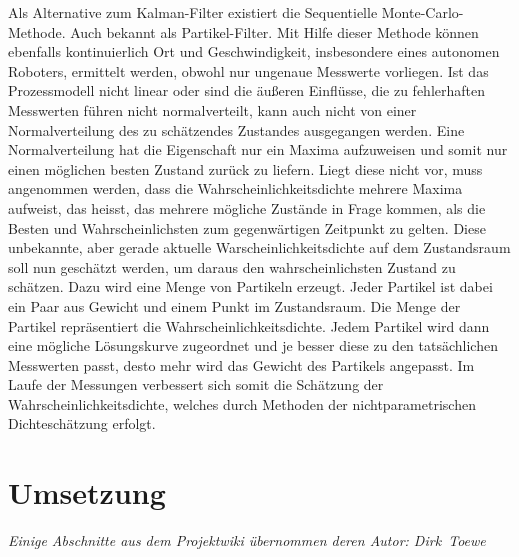 Als Alternative zum Kalman-Filter existiert die Sequentielle Monte-Carlo-Methode. Auch bekannt als Partikel-Filter. Mit Hilfe dieser Methode können ebenfalls kontinuierlich Ort und Geschwindigkeit, insbesondere eines autonomen Roboters, ermittelt werden, obwohl nur ungenaue Messwerte vorliegen.
Ist das Prozessmodell nicht linear oder sind die äußeren Einflüsse, die zu fehlerhaften Messwerten führen nicht normalverteilt, kann auch nicht von einer Normalverteilung des zu schätzendes Zustandes ausgegangen werden. Eine Normalverteilung hat die Eigenschaft nur ein Maxima aufzuweisen und somit nur einen möglichen besten Zustand zurück zu liefern. Liegt diese nicht vor, muss angenommen werden, dass die Wahrscheinlichkeitsdichte mehrere Maxima aufweist, das heisst, das mehrere mögliche Zustände in Frage kommen, als die Besten und Wahrscheinlichsten zum gegenwärtigen Zeitpunkt zu gelten.
Diese unbekannte, aber gerade aktuelle Warscheinlichkeitsdichte auf dem Zustandsraum soll nun geschätzt werden, um daraus den wahrscheinlichsten Zustand zu schätzen. Dazu wird eine Menge von Partikeln erzeugt. Jeder Partikel ist dabei ein Paar aus Gewicht und einem Punkt im Zustandsraum. Die Menge der Partikel repräsentiert die Wahrscheinlichkeitsdichte.
Jedem Partikel wird dann eine mögliche Lösungskurve zugeordnet und je besser diese zu den tatsächlichen Messwerten passt, desto mehr wird das Gewicht des Partikels angepasst. Im Laufe der Messungen verbessert sich somit die Schätzung der Wahrscheinlichkeitsdichte, welches durch Methoden der nichtparametrischen Dichteschätzung erfolgt.\citep{rob3}

 
\section{Umsetzung}
\label{lokalisierung_umsetzung_sec}
\authorsection{\editorandreas}
\begin{flushright}\textit{Einige Abschnitte aus dem Projektwiki übernommen deren
Autor: Dirk~Toewe}\end{flushright}
